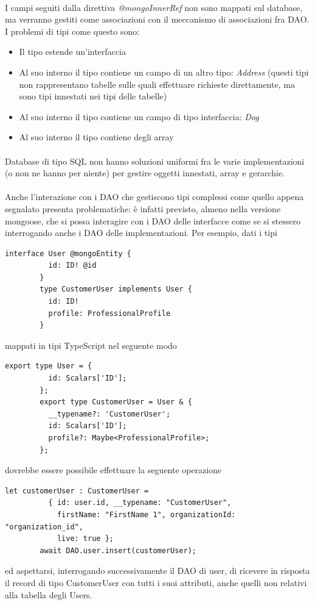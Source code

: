 \documentclass[a4paper, 12pt]{report}
\begin{document}
      \paragraph*{}
      I campi seguiti dalla direttiva \emph{@mongoInnerRef} non sono mappati sul database, ma verranno gestiti come associazioni con il meccanismo di associazioni fra DAO.
      I problemi di tipi come questo sono:
      \begin{itemize}
        \item Il tipo estende un'interfaccia
        \item Al suo interno il tipo contiene un campo di un altro tipo: \emph{Address} (questi tipi non rappresentano tabelle sulle quali effettuare richieste direttamente, ma sono tipi innestati nei tipi delle tabelle)
        \item Al suo interno il tipo contiene un campo di tipo interfaccia: \emph{Dog}
        \item Al suo interno il tipo contiene degli array
      \end{itemize}
      \paragraph*{}
      Database di tipo SQL non hanno soluzioni uniformi fra le varie implementazioni (o non ne hanno per niente) per gestire oggetti innestati, array e gerarchie.
      \paragraph*{}
      Anche l'interazione con i DAO che gestiscono tipi complessi come quello appena segnalato presenta problematiche: è infatti previsto, almeno nella versione mongoose, che si possa interagire con i DAO delle interfacce come se si stessero interrogando anche i DAO delle implementazioni.
      Per esempio, dati i tipi
      \begin{Verbatim}[samepage=true]
        interface User @mongoEntity {
          id: ID! @id
        }
        type CustomerUser implements User {
          id: ID!
          profile: ProfessionalProfile
        }
      \end{Verbatim}
      mappati in tipi TypeScript nel seguente modo
      \begin{Verbatim}[samepage=true]
        export type User = {
          id: Scalars['ID'];
        };
        export type CustomerUser = User & {
          __typename?: 'CustomerUser';
          id: Scalars['ID'];
          profile?: Maybe<ProfessionalProfile>;
        };
      \end{Verbatim}
      dovrebbe essere possibile effettuare la seguente operazione
      \begin{Verbatim}[samepage=true]
        let customerUser : CustomerUser = 
          { id: user.id, __typename: "CustomerUser",
            firstName: "FirstName 1", organizationId: "organization_id",
            live: true };
        await DAO.user.insert(customerUser);
      \end{Verbatim}
      ed aspettarsi, interrogando successivamente il DAO di user, di ricevere in risposta il record di tipo CustomerUser con tutti i suoi attributi, anche quelli non relativi alla tabella degli Users.
    \newpage
\end{document}
